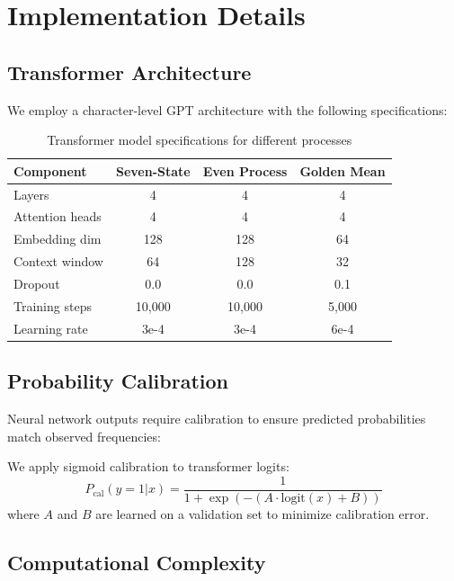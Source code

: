 \documentclass[11pt,a4paper]{report}
\theoremstyle{definition}
\begin{document}
\section{Implementation Details}
\label{sec:implementation}

\subsection{Transformer Architecture}

We employ a character-level GPT architecture with the following specifications:

\begin{table}[htbp]
\centering
\caption{Transformer model specifications for different processes}
\label{tab:model-specs}
\begin{tabular}{@{}lccc@{}}
\toprule
\textbf{Component} & \textbf{Seven-State} & \textbf{Even Process} & \textbf{Golden Mean} \\
\midrule
Layers & 4 & 4 & 4 \\
Attention heads & 4 & 4 & 4 \\
Embedding dim & 128 & 128 & 64 \\
Context window & 64 & 128 & 32 \\
Dropout & 0.0 & 0.0 & 0.1 \\
Training steps & 10,000 & 10,000 & 5,000 \\
Learning rate & 3e-4 & 3e-4 & 6e-4 \\
\bottomrule
\end{tabular}
\end{table}

\subsection{Probability Calibration}

Neural network outputs require calibration to ensure predicted probabilities match observed frequencies:

\begin{notebox}
We apply sigmoid calibration to transformer logits:
$$P_{\text{cal}}(y=1|x) = \frac{1}{1 + \exp(-(A \cdot \text{logit}(x) + B))}$$
where $A$ and $B$ are learned on a validation set to minimize calibration error.
\end{notebox}

\subsection{Computational Complexity}
\end{document}
